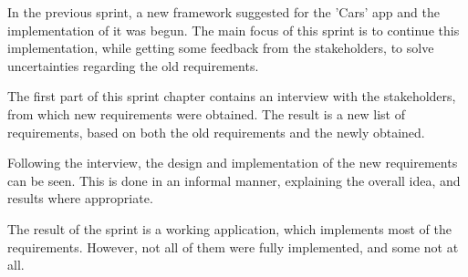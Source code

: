 In the previous sprint, a new framework suggested for the 'Cars' app and the implementation of it was begun.
The main focus of this sprint is to continue this implementation, while getting some feedback from the stakeholders, to solve uncertainties regarding the old requirements.

The first part of this sprint chapter contains an interview with the stakeholders, from which new requirements were obtained.
The result is a new list of requirements, based on both the old requirements and the newly obtained.

Following the interview, the design and implementation of the new requirements can be seen.
This is done in an informal manner, explaining the overall idea, and results where appropriate.

The result of the sprint is a working application, which implements most of the requirements.
However, not all of them were fully implemented, and some not at all.